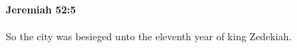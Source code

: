 
		\paragraph{Jeremiah 52:5} %
			\label{JEREMIAH-52-5}

			So the city was besieged unto the eleventh year of king Zedekiah.


